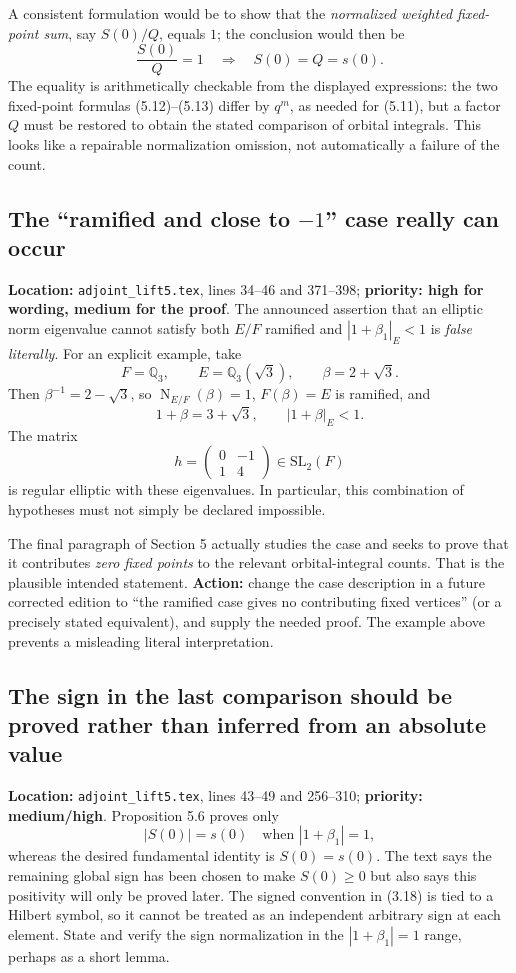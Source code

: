 \documentclass[12pt,letterpaper]{article}
\newcommand{\Nm}{\operatorname{N}}
\begin{document}
A consistent formulation would be to show that the \emph{normalized
weighted fixed-point sum}, say $S(0)/Q$, equals $1$; the conclusion
would then be
\[
\frac{S(0)}Q=1\quad\Longrightarrow\quad S(0)=Q=s(0).
\]
The equality is arithmetically checkable from the displayed expressions:
the two fixed-point formulas (5.12)--(5.13) differ by $q^m$, as
needed for (5.11), but a factor $Q$ must be restored to obtain the
stated comparison of orbital integrals. This looks like a repairable
normalization omission, not automatically a failure of the count.

\subsection{The ``ramified and close to $-1$'' case really can occur}
\label{issue:ramified}

\textbf{Location:} \texttt{adjoint\_lift5.tex}, lines 34--46
and 371--398; \textbf{priority: high for wording, medium for the proof}.
The announced assertion that an elliptic norm eigenvalue cannot satisfy
both $E/F$ ramified and $|1+\beta_1|_E<1$ is \emph{false literally}.
For an explicit example, take
\[
F=\mathbb Q_3,\qquad E=\mathbb Q_3(\sqrt3),\qquad
\beta=2+\sqrt3.
\]
Then $\beta^{-1}=2-\sqrt3$, so $\Nm_{E/F}(\beta)=1$,
$F(\beta)=E$ is ramified, and
\[
1+\beta=3+\sqrt3,\qquad |1+\beta|_E<1.
\]
The matrix
\[
h=\begin{pmatrix}0&-1\\1&4\end{pmatrix}\in\mathrm{SL}_2(F)
\]
is regular elliptic with these eigenvalues. In particular, this
combination of hypotheses must not simply be declared impossible.

The final paragraph of Section 5 actually studies the case and seeks
to prove that it contributes \emph{zero fixed points} to the relevant
orbital-integral counts. That is the plausible intended statement.
\textbf{Action:} change the case description in a future corrected
edition to ``the ramified case gives no contributing fixed vertices''
(or a precisely stated equivalent), and supply the needed proof. The
example above prevents a misleading literal interpretation.

\subsection{The sign in the last comparison should be proved rather than
inferred from an absolute value}
\label{issue:sign}

\textbf{Location:} \texttt{adjoint\_lift5.tex}, lines 43--49 and
256--310; \textbf{priority: medium/high}. Proposition 5.6 proves only
\[
|S(0)|=s(0)
\quad\text{when }|1+\beta_1|=1,
\]
whereas the desired fundamental identity is $S(0)=s(0)$. The text says
the remaining global sign has been chosen to make $S(0)\ge0$ but also
says this positivity will only be proved later. The signed convention
in (3.18) is tied to a Hilbert symbol, so it cannot be treated as an
independent arbitrary sign at each element. State and verify the sign
normalization in the $|1+\beta_1|=1$ range, perhaps as a short lemma.
\end{document}
